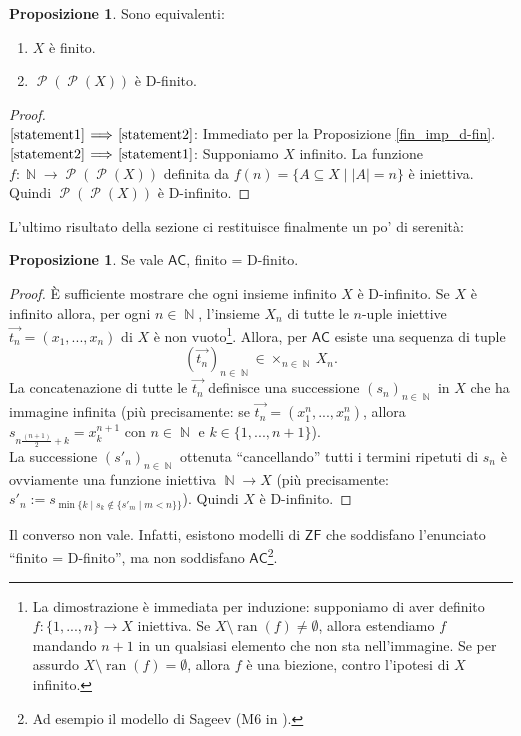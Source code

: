 \documentclass[12pt,a4paper]{report}
\theoremstyle{definition}
\newtheorem{prop}[teo]{Proposizione}  %
\theoremstyle{num.custom-title}
\DeclareMathOperator{\ran}{ran}
\DeclareMathOperator{\PP}{\mathcal{P}}
\DeclareMathOperator{\N}{\mathbb{N}}
\DeclareMathOperator{\sm}{\setminus}
\newcommand{\AC}{\ensuremath{\mathsf{AC}}\xspace}
\newcommand{\ZF}{\ensuremath{\mathsf{ZF}}\xspace}
\newcommand{\Implies}[2]{$\text{\ref{statement#1}}\!\implies\!\text{\ref{statement#2}}$}%
\newcommand{\punto}[1]{\item \label{statement#1}}
\newenvironment{equivalence}
    {\begin{enumerate}[label=(\arabic*),ref=(\arabic*)]
    }
    { 
	\end{enumerate}
    }
\begin{document}
\begin{prop}\label{prop_P(P(X))} Sono equivalenti:
\begin{equivalence}
\punto{1} $X$ è finito.
\punto{2} $\PP(\PP(X))$ è D-finito.
\end{equivalence}
\begin{proof}\ \\
\Implies{1}{2}: Immediato per la Proposizione \ref{fin_imp_d-fin}.\\
\Implies{2}{1}: Supponiamo $X$ infinito. La funzione $f: \N \to \PP(\PP(X))$ definita da $f(n)=\{A \subseteq X \mid |A|=n\}$ è iniettiva. Quindi $\PP(\PP(X))$ è D-infinito.
\end{proof}
\end{prop}

L'ultimo risultato della sezione ci restituisce finalmente un po' di serenità:

\begin{prop} 
Se vale \AC, finito = D-finito.
\begin{proof}
È sufficiente mostrare che ogni insieme infinito $X$ è D-infinito. Se $X$ è infinito allora, per ogni $n \in \N$, l'insieme $X_n$ di tutte le $n$-uple iniettive $\overrightarrow{t_n} = (x_1,...,x_n)$ di $X$ è non vuoto\footnote{La dimostrazione è immediata per induzione: supponiamo di aver definito $f: \{1,...,n\} \to X$ iniettiva. Se $X \sm \ran(f) \neq \emptyset$, allora estendiamo $f$ mandando $n+1$ in un qualsiasi elemento che non sta nell'immagine. Se per assurdo $X \sm \ran(f) = \emptyset$, allora $f$ è una biezione, contro l'ipotesi di $X$ infinito.}. Allora, per \AC esiste una sequenza di tuple 
\[
\left(\overrightarrow{t_n}\right)_{n \in \N} \in \times_{n \in \N} X_n.
\]
La concatenazione di tutte le $\overrightarrow{t_n}$ definisce una successione $(s_n)_{n \in \N}$ in $X$ che ha immagine infinita (più precisamente: se $\overrightarrow{t_n}=(x_1^n,...,x_n^n)$, allora $s_{n \frac{(n+1)}{2}+k} = x_k^{n+1}$ con $n \in \N$ e $k \in \{1,...,n+1\}$).\\
La successione $(s'_n)_{n \in \N}$ ottenuta ``cancellando'' tutti i termini ripetuti di $s_n$ è ovviamente una funzione iniettiva $\N \to X$ (più precisamente: $s'_n := s_{\min\{k \mid s_k \not\in \{s'_m \mid m<n\}\}}$). Quindi $X$ è D-infinito.
\end{proof}
\end{prop}

Il converso non vale. Infatti, esistono modelli di \ZF che soddisfano l'enunciato ``finito = D-finito'', ma non soddisfano \AC\footnote{Ad esempio il modello di Sageev (M6 in \cite{HoRu98:Herrlich}).}.
\end{document}
